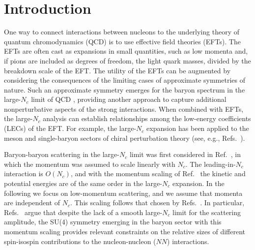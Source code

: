 \documentclass[nofootinbib, preprint, aps, prc, superscriptaddress,11pt]{revtex4-1}
\newcommand{\Nc}{\ensuremath{N_c}\xspace}
\newcommand{\NN}{\ensuremath{N\!N}\xspace}
\newcommand{\1}{\mathbbm{1}}
\begin{document}
\maketitle

\section{Introduction}



One way to connect interactions between nucleons to the underlying theory of quantum chromodynamics (QCD) is to use effective field theories (EFTs). 
The EFTs are often cast as expansions in small quantities, such as low momenta and, if pions are included as degrees of freedom, the light quark masses, divided by the breakdown scale of the EFT.
The utility of the EFTs can be augmented by considering the consequences of the limiting cases of approximate symmetries of nature.  
Such an approximate symmetry emerges for the baryon spectrum in the large-\Nc limit of QCD \cite{tHooft:1973jz,Gervais:1983wq,Gervais:1984rc,Dashen:1993as}, providing another approach to capture additional nonperturbative aspects of the strong interactions. 
When combined with EFTs, the large-\Nc analysis can establish relationships among the low-energy coefficients (LECs) of the EFT.
For example, the large-\Nc expansion has been applied to the meson and single-baryon sectors of chiral perturbation theory (see, e.g., Refs.~\cite{Moussallam:1994xp,Jenkins:1995gc,Herrera-Siklody:1996tqr,Leutwyler:1997yr,Kaiser:2000gs,Flores-Mendieta:2000ljq,Flores-Mendieta:2006ojy,Flores-Mendieta:2009vss, Flores-Mendieta:2014vaa,Flores-Mendieta:2024kvj,Jayakodige:2025agk}).


Baryon-baryon scattering in the large-\Nc limit was first considered in Ref.~\cite{Witten:1979kh}, in which the momentum was assumed to scale linearly with \Nc. The leading-in-\Nc interaction is $O(\Nc)$, and with the momentum scaling of Ref.~\cite{Witten:1979kh} the kinetic and potential energies are of the same order in the large-\Nc expansion. 
In the following we focus on low-momentum scattering, and we assume that momenta are independent of \Nc.
This scaling follows that chosen by Refs.~\cite{Kaplan:1995yg,Kaplan:1996rk,Banerjee:2001js}.  
In particular, Refs.~\cite{Kaplan:1995yg,Kaplan:1996rk} argue that despite the lack of a smooth large-\Nc limit for the scattering amplitude, the SU(4) symmetry emerging in the baryon sector with this momentum scaling provides relevant constraints on the relative sizes of different spin-isospin contributions to the nucleon-nucleon (\NN) interactions.
\end{document}
